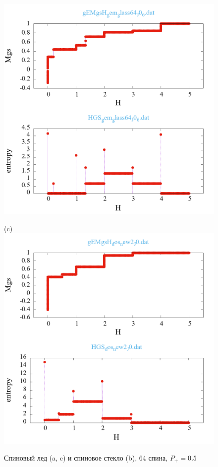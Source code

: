 \documentclass[utf8, babel, sor, jor, amsmath, amssymb, reprint]{elsarticle} %
\begin{document}
\begin{figure}[H]
\begin{minipage}[h]{0.32\linewidth}
		\includegraphics[width=1\linewidth]{pictures/_multiplot_SG64_J0}
	\end{minipage}
	\hfill
	\begin{minipage}[h]{0.32\linewidth}
		\centering(c)
		\includegraphics[width=1\linewidth]{pictures/_multiplot_SI64_J0}
	\end{minipage}
	
	\caption{Спиновый лед (a, c) и спиновое стекло (b), 64 спина, $P_+ = 0.5$}
	\label{fig:_multiplot_SI_SG_64}
	
\end{figure}
\end{document}
